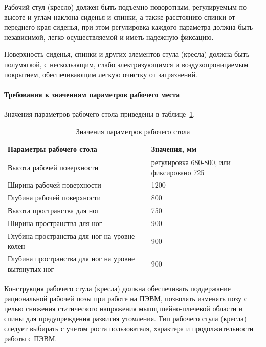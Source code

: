 Рабочий стул (кресло) должен быть подъемно-поворотным, регулируемым по высоте и углам наклона сиденья и спинки, а также расстоянию спинки от переднего края сиденья, при этом регулировка каждого параметра должна быть независимой, легко осуществляемой и иметь надежную фиксацию.

Поверхность сиденья, спинки и других элементов стула (кресла) должна быть полумягкой, с нескользящим, слабо электризующимся и воздухопроницаемым покрытием, обеспечивающим легкую очистку от загрязнений.

\paragraph{Требования к значениям параметров рабочего места}

Значения параметров рабочего стола приведены в таблице~\ref{bzd:workplace}.

\begin{table}[!htb]
	\caption{Значения параметров рабочего стола}\label{bzd:workplace}
    \centering
    \begin{tabular}{|p{10cm}|p{6cm}|}
        \hline 
        \textbf{Параметры рабочего стола} & \textbf{Значения, мм} \\ 
        \hline 
        Высота рабочей поверхности & регулировка 680-800,
или фиксировано 725 \\ 
        \hline 
        Ширина рабочей поверхности & 1200 \\ 
        \hline 
        Глубина рабочей поверхности & 800 \\ 
        \hline 
        Высота пространства для ног & 750 \\ 
        \hline 
        Ширина пространства для ног & 900 \\ 
        \hline 
        Глубина пространства для ног на уровне колен & 900 \\ 
        \hline 
        Глубина пространства для ног на уровне вытянутых ног & 900 \\ 
        \hline 
        \end{tabular}     
    		
\end{table}

Конструкция рабочего стула (кресла) должна обеспечивать поддержание рациональной рабочей позы при работе на ПЭВМ, позволять изменять позу с целью снижения статического напряжения мышц шейно-плечевой области и спины для предупреждения развития утомления. Тип рабочего стула (кресла) следует выбирать с учетом роста пользователя, характера и продолжительности работы с ПЭВМ.

